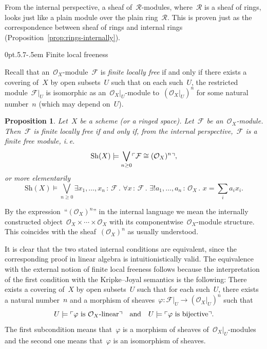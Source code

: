 \documentclass[10pt,reqno,a4paper]{amsbook}
\makeatletter
\theoremstyle{definition}
\theoremstyle{plain}
\newtheorem{prop}[defn]{Proposition}
\theoremstyle{remark}
\newcommand{\F}{\mathcal{F}}
\renewcommand{\O}{\mathcal{O}}
\newcommand{\R}{\mathcal{R}}
\newcommand{\Sh}{\mathrm{Sh}}
\newcommand{\?}{\,{:}\,}
\renewcommand{\_}{\mathpunct{.}\,}
\newcommand{\speak}[1]{\ulcorner\text{\textnormal{#1}}\urcorner}
\newcommand{\ie}{i.\,e.\@\xspace}
\renewenvironment{proof}[1][\proofname]{\par
  \pushQED{\qed}%
  \normalfont \topsep6\p@\@plus6\p@\relax
  \trivlist
  \item[\hskip\labelsep
        \itshape
    #1\@addpunct{.}]\ignorespaces
}{%
  \popQED\endtrivlist\@endpefalse
}
\def\subsection{\@startsection{subsection}{2}%
  {0pt}{.5\linespacing\@plus.7\linespacing}{-.5em}%
  {\normalfont\bfseries}}
\makeatother
\begin{document}
From the internal perspective, a sheaf of~$\R$-modules, where~$\R$ is a sheaf
of rings, looks just like a plain module over the plain ring~$\R$. This is
proven just as the correspondence between sheaf of rings and internal rings
(Proposition~\ref{prop:rings-internally}).


\subsection{Finite local freeness}

Recall that an~$\O_X$-module~$\F$ is \emph{finite locally free} if and only
if there exists a covering of~$X$ by open subsets~$U$ such that on each
such~$U$, the restricted module~$\F|_U$ is isomorphic as an~$\O_X|_U$-module
to~$(\O_X|_U)^n$ for some natural number~$n$ (which may depend on~$U$).

\begin{prop}\label{prop:locally-free}
Let~$X$ be a scheme (or a ringed space). Let~$\F$ be
an~$\O_X$-module. Then~$\F$ is finite locally free if and only if, from the
internal perspective,~$\F$ is a finite free module, \ie
\[ \Sh(X) \models \bigvee_{n \geq 0} \speak{$\F \cong (\O_X)^n$}, \]
or more elementarily
\[ \Sh(X) \models \bigvee_{n \geq 0}
  \exists x_1,\ldots,x_n\?\F\_
  \forall x\?\F\_
  \exists! a_1,\ldots,a_n\?\O_X\_
  x = \textstyle\sum\limits_i a_i x_i. \]
\end{prop}
\begin{proof}By the expression~``$(\O_X)^n$'' in the internal language we mean
the internally constructed object~$\O_X \times \cdots \times \O_X$ with its
componentwise~$\O_X$-module structure. This coincides with the sheaf~$(\O_X)^n$ as
usually understood.

It is clear that the two stated internal conditions are equivalent, since the
corresponding proof in linear algebra is intuitionistically valid. The equivalence with
the external notion of finite local freeness follows because the
interpretation of the first condition with the Kripke--Joyal semantics is the
following: There exists a covering of~$X$ by open subsets~$U$ such that for
each such~$U$, there exists a natural number~$n$ and a morphism of
sheaves~$\varphi : \F|_U \to (\O_X|_U)^n$ such that
\[ U \models \speak{$\varphi$ is~$\O_X$-linear} \quad\text{and}\quad
  U \models \speak{$\varphi$ is bijective}. \]
The first subcondition means that~$\varphi$ is a morphism of sheaves
of~$\O_X|_U$-modules and the second one means that~$\varphi$ is an isomorphism of
sheaves.
\end{proof}
\end{document}
